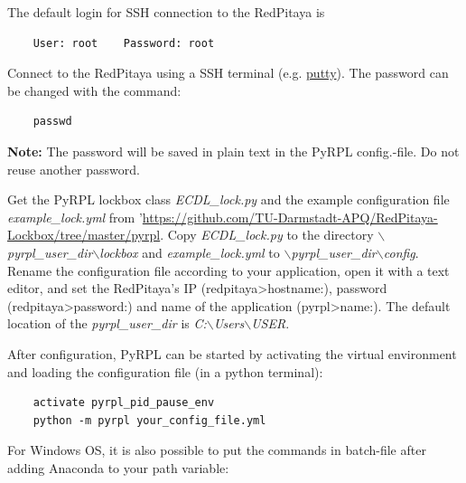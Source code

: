 \documentclass[twoside,a4paper]{refart}
\begin{document}
 The default login for SSH connection to the RedPitaya is

\begin{tcolorbox}
	\begin{verbatim}
	User: root    Password: root
	\end{verbatim}
\end{tcolorbox}

Connect to the RedPitaya using a SSH terminal (e.g. \href{https://www.putty.org/}{putty}). The password can be changed with the command:
\begin{tcolorbox}
	\begin{verbatim}
	passwd
	\end{verbatim}
\end{tcolorbox}

\textbf{Note: }The password will be saved in plain text in the PyRPL config.-file. Do not reuse another password.

Get the PyRPL lockbox class \textit{ECDL\_lock.py} and the example configuration file \textit{example\_lock.yml} from '\href{https://github.com/TU-Darmstadt-APQ/RedPitaya-Lockbox/tree/master/pyrpl}{https://github.com/TU-Darmstadt-APQ/RedPitaya-Lockbox/tree/master/pyrpl}. Copy \textit{ECDL\_lock.py} to the directory \textit{$\backslash$pyrpl\_user\_dir$\backslash$lockbox}  and \textit{example\_lock.yml} to \linebreak \textit{$\backslash$pyrpl\_user\_dir$\backslash$config}. Rename the configuration file according to your application, open it with a text editor, and set the RedPitaya's IP (redpitaya>hostname:), password  (redpitaya>password:) and name of the application (pyrpl>name:). The default location of the \textit{pyrpl\_user\_dir} is \textit{C:$\backslash$Users$\backslash$USER}.

After configuration, PyRPL can be started by activating the virtual environment and loading the configuration file (in a python terminal):

\begin{tcolorbox}
	\begin{verbatim}
	activate pyrpl_pid_pause_env
	python -m pyrpl your_config_file.yml
	\end{verbatim}
\end{tcolorbox}

For Windows OS, it is also possible to put the commands in batch-file after adding Anaconda to your path variable:
\end{document}
